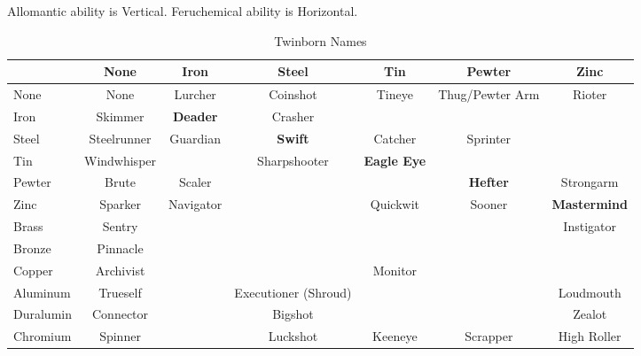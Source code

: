 \documentclass[conference]{IEEEtran}
\begin{document}
\begin{table}[h]
	
	\caption{Twinborn Names}
	Allomantic ability is Vertical.  Feruchemical ability is Horizontal.
	\begin{center}
	
	\begin{tabular}{|l |c |c |c |c |c |c | }
		\hline
		\cellcolor{black}&None&Iron&Steel&Tin&Pewter&Zinc\\\hline
		
		\hline
		None&None&\cellcolor{darkgreen}Lurcher&\cellcolor{darkgreen}Coinshot&\cellcolor{darkgreen}Tineye&\cellcolor{darkgreen}Thug/Pewter Arm&\cellcolor{darkgreen}Rioter\\\hline
		Iron&\cellcolor{darkgreen}Skimmer&\cellcolor{lightgreen}\textbf{Deader}&\cellcolor{darkgreen}Crasher& & & \\\hline
		Steel&\cellcolor{darkgreen}Steelrunner&\cellcolor{lightgreen}Guardian&\cellcolor{lightgreen}\textbf{Swift}&\cellcolor{lightgreen}Catcher& \cellcolor{lightgreen}Sprinter& \\\hline
		Tin&\cellcolor{darkgreen}Windwhisper& &\cellcolor{lightgreen}Sharpshooter&\cellcolor{lightgreen}\textbf{Eagle Eye}& & \\\hline
		Pewter&\cellcolor{darkgreen}Brute&\cellcolor{lightgreen} Scaler& & &\cellcolor{lightgreen}\textbf{Hefter}&\cellcolor{lightgreen} Strongarm \\\hline
		Zinc&\cellcolor{darkgreen}Sparker&\cellcolor{lightgreen}Navigator& &\cellcolor{lightgreen}Quickwit&\cellcolor{lightgreen}Sooner& \cellcolor{lightgreen}\textbf{Mastermind} \\\hline
		Brass&\cellcolor{orange}Sentry& & & & & \cellcolor{lightorange}Instigator  \\\hline
		Bronze&\cellcolor{darkgreen}Pinnacle& & & & & 
		\\\hline
		Copper&\cellcolor{darkgreen}Archivist& & &  \cellcolor{lightgreen}Monitor
		& &\\\hline
		Aluminum&\cellcolor{darkgreen}Trueself& &\cellcolor{red} Executioner (Shroud) & &  &\cellcolor{lightgreen}Loudmouth\\\hline
		Duralumin&\cellcolor{darkgreen}Connector& &\cellcolor{lightgreen}Bigshot& & &\cellcolor{lightgreen}Zealot \\\hline
		Chromium& \cellcolor{darkgreen}Spinner &&\cellcolor{lightgreen}Luckshot&\cellcolor{lightgreen}Keeneye&\cellcolor{lightgreen}Scrapper&\cellcolor{lightgreen}High Roller\\\hline

\end{tabular}
\end{center}
\end{table}
\end{document}
